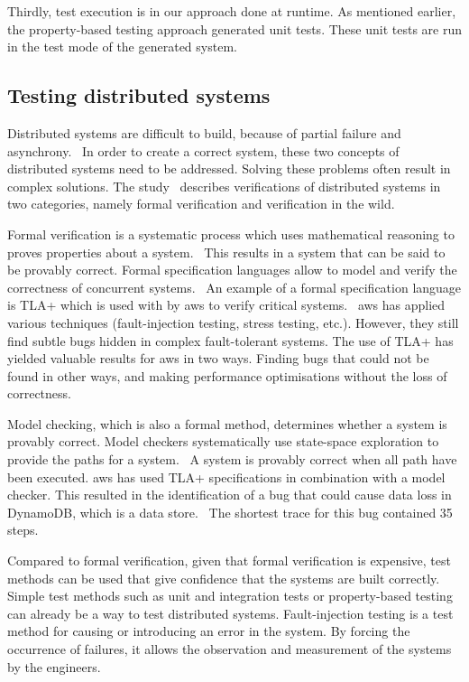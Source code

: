 Thirdly, test execution is in our approach done at runtime.
As mentioned earlier, the property-based testing approach generated unit tests.
These unit tests are run in the test mode of the generated system.

\subsection*{Testing distributed systems}

Distributed systems are difficult to build, because of partial failure and
asynchrony.~\cite[p.~1]{mccaffrey2016verification}
In order to create a correct system, these two concepts of distributed systems
need to be addressed. Solving these problems often result in complex solutions.
The study~\cite{mccaffrey2016verification} describes verifications of
distributed systems in two categories, namely formal verification and
verification in the wild.

Formal verification is a systematic process which uses mathematical reasoning to
proves properties about a system.~\cite{mccaffrey2016verification, sanghavi2010formal}
This results in a system that can be said to be provably correct.
Formal specification languages allow to model and verify the correctness of
concurrent systems.~\cite[p.~2]{mccaffrey2016verification}
An example of a formal specification language is TLA+ which is used with by
\gls{aws} to verify critical systems.~\cite[p.~1]{newcombe2014use}
\gls{aws} has applied various techniques (fault-injection testing, stress testing,
etc.). However, they still find subtle bugs hidden in complex fault-tolerant
systems.
The use of TLA+ has yielded valuable results for \gls{aws} in two ways. Finding
bugs that could not be found in other ways, and making performance optimisations
without the loss of correctness.~\cite[p.~3]{newcombe2014use}

Model checking, which is also a formal method, determines whether a system is
provably correct. Model checkers systematically use state-space exploration to
provide the paths for a system.~\cite[p.~3]{mccaffrey2016verification}
A system is provably correct when all path have been executed.
\gls{aws} has used TLA+ specifications in combination with a model checker. This
resulted in the identification of a bug that could cause data loss in DynamoDB,
which is a data store.~\cite[p.~7]{newcombe2014use}
The shortest trace for this bug contained 35 steps.

Compared to formal verification, given that formal verification is expensive,
test methods can be used that give confidence that the systems are built
correctly.~\cite[p.~4]{mccaffrey2016verification}
Simple test methods such as unit and integration tests or property-based testing
can already be a way to test distributed systems.
Fault-injection testing is a test method for causing or introducing an error in
the system. By forcing the occurrence of failures, it allows the observation
and measurement of the systems by the engineers.

